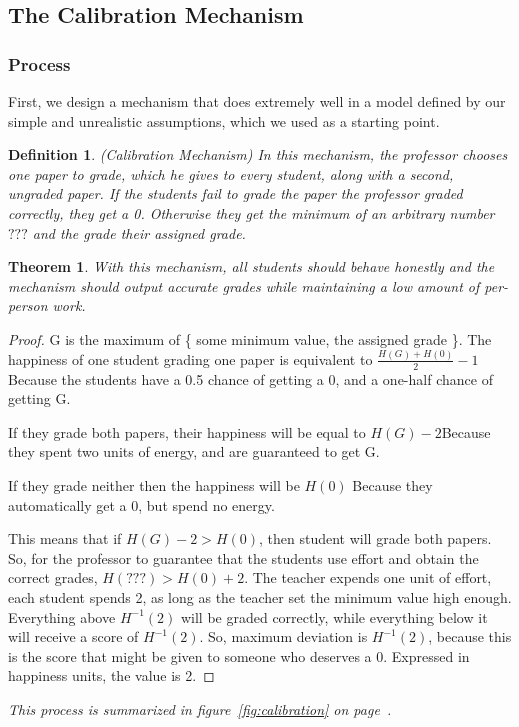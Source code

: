 \documentclass[12pt, Arial]{article}
\newtheorem{theorem}{Theorem}
\newtheorem{definition}{Definition}
\begin{document}
\subsection{The Calibration Mechanism}
\label{sec:calibration}

\subsubsection{Process}
First, we design a mechanism that does extremely well in a model defined by our simple and unrealistic assumptions, which we used as a starting point.
\begin{definition}(Calibration Mechanism)
In this mechanism, the professor chooses one paper to grade, which he gives to every student, along with a second, ungraded paper. If the students fail to grade the paper the professor graded correctly, they get a 0. Otherwise they get the minimum of an arbitrary number $???$ and the grade their assigned grade.
\end{definition}
\begin{theorem}
With this mechanism, all students should behave honestly and the mechanism should output accurate grades while maintaining a low amount of per-person work.
\end{theorem}

\begin{proof}
G is the maximum of \{ some minimum value, the assigned grade \}.
The happiness of one student grading one paper is equivalent to $\frac{H(G)+H(0)}{2}-1$ Because the students have a 0.5 chance of getting a 0, and a one-half chance of getting G.

If they grade both papers, their happiness will be equal to $H(G)-2$Because they spent two units of energy, and are guaranteed to get G.

If they grade neither then the happiness will be $H(0)$ Because they automatically get a 0, but spend no energy.

This means that if $H(G) - 2 > H(0)$, then student will grade both papers. So, for the professor to guarantee that the students use effort and obtain the correct grades, $H(???) > H(0) + 2$.
The teacher expends one unit of effort, each student spends 2, as long as the teacher set the minimum value high enough.
Everything above $H^{-1}(2)$ will be graded correctly, while everything below it will receive a score of $H^{-1}(2)$.
So, maximum deviation is $H^{-1}(2)$, because this is the score that might be given to someone who deserves a 0. Expressed in happiness units, the value is 2.
\end{proof}
\emph{This process is summarized in figure~\ref{fig:calibration} on page~\pageref{fig:calibration}.}
\end{document}
